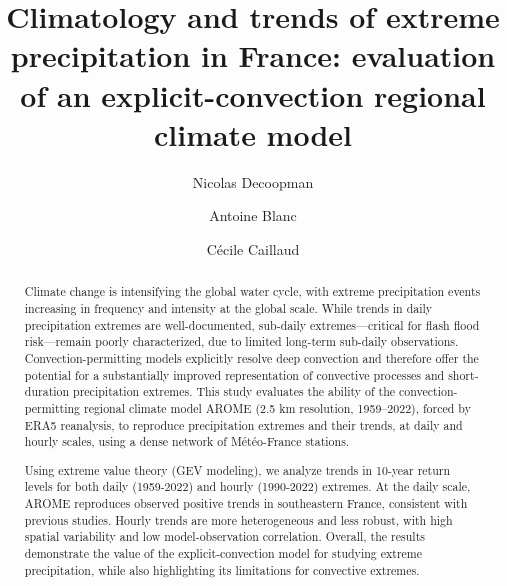 \documentclass[hess, manuscript]{copernicus}
\begin{document}
\title{Climatology and trends of extreme precipitation in France: evaluation of an explicit-convection regional climate model}
\author[1]{Nicolas Decoopman}
\author[2]{Antoine Blanc}
\author[3]{Cécile Caillaud}



\maketitle


\begin{abstract}Climate change is intensifying the global water cycle, with extreme precipitation events increasing in frequency and intensity at the global scale. While trends in daily precipitation extremes are well-documented, sub-daily extremes---critical for flash flood risk---remain poorly characterized, due to limited long-term sub-daily observations. Convection-permitting models explicitly resolve deep convection and therefore offer the potential for a substantially improved representation of convective processes and short-duration precipitation extremes. This study evaluates the ability of the convection-permitting regional climate model AROME (2.5 km resolution, 1959--2022), forced by ERA5 reanalysis, to reproduce precipitation extremes and their trends, at daily and hourly scales, using a dense network of Météo-France stations.

Using extreme value theory (GEV modeling), we analyze trends in 10-year return levels for both daily (1959-2022) and hourly (1990-2022) extremes. At the daily scale, AROME reproduces observed positive trends in southeastern France, consistent with previous studies. Hourly trends are more heterogeneous and less robust, with high spatial variability and low model-observation correlation. Overall, the results demonstrate the value of the explicit-convection model for studying extreme precipitation, while also highlighting its limitations for convective extremes.
\end{abstract}
\end{document}
